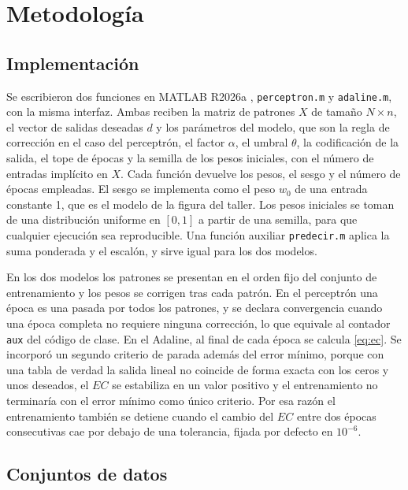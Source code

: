 \documentclass[conference]{IEEEtran}
\begin{document}
\section{Metodolog\'ia}
\label{sec:metodo}

\subsection{Implementaci\'on}

Se escribieron dos funciones en MATLAB R2026a \cite{matlab2026}, \texttt{perceptron.m} y \texttt{adaline.m}, con la misma interfaz. Ambas reciben la matriz de patrones $X$ de tama\~no $N \times n$, el vector de salidas deseadas $d$ y los par\'ametros del modelo, que son la regla de correcci\'on en el caso del perceptr\'on, el factor $\alpha$, el umbral $\theta$, la codificaci\'on de la salida, el tope de \'epocas y la semilla de los pesos iniciales, con el n\'umero de entradas impl\'icito en $X$. Cada funci\'on devuelve los pesos, el sesgo y el n\'umero de \'epocas empleadas. El sesgo se implementa como el peso $w_0$ de una entrada constante 1, que es el modelo de la figura del taller. Los pesos iniciales se toman de una distribuci\'on uniforme en $[0,1]$ a partir de una semilla, para que cualquier ejecuci\'on sea reproducible. Una funci\'on auxiliar \texttt{predecir.m} aplica la suma ponderada y el escal\'on, y sirve igual para los dos modelos.

En los dos modelos los patrones se presentan en el orden fijo del conjunto de entrenamiento y los pesos se corrigen tras cada patr\'on. En el perceptr\'on una \'epoca es una pasada por todos los patrones, y se declara convergencia cuando una \'epoca completa no requiere ninguna correcci\'on, lo que equivale al contador \texttt{aux} del c\'odigo de clase. En el Adaline, al final de cada \'epoca se calcula \eqref{eq:ec}. Se incorpor\'o un segundo criterio de parada adem\'as del error m\'inimo, porque con una tabla de verdad la salida lineal no coincide de forma exacta con los ceros y unos deseados, el $EC$ se estabiliza en un valor positivo y el entrenamiento no terminar\'ia con el error m\'inimo como \'unico criterio. Por esa raz\'on el entrenamiento tambi\'en se detiene cuando el cambio del $EC$ entre dos \'epocas consecutivas cae por debajo de una tolerancia, fijada por defecto en $10^{-6}$.

\subsection{Conjuntos de datos}
\end{document}
